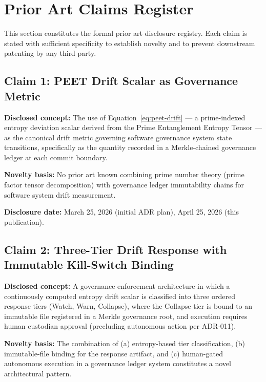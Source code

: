 \documentclass[11pt,letterpaper]{article}
\theoremstyle{definition}
\theoremstyle{remark}
\begin{document}
\section{Prior Art Claims Register}

This section constitutes the formal prior art disclosure registry.
Each claim is stated with sufficient specificity to establish
novelty and to prevent downstream patenting by any third party.

\subsection{Claim 1: PEET Drift Scalar as Governance Metric}

\textbf{Disclosed concept:} The use of Equation~\eqref{eq:peet-drift}
--- a prime-indexed entropy deviation scalar derived from the Prime
Entanglement Entropy Tensor --- as the canonical drift metric
governing software governance system state transitions, specifically
as the quantity recorded in a Merkle-chained governance ledger at
each commit boundary.

\textbf{Novelty basis:} No prior art known combining prime number
theory (prime factor tensor decomposition) with governance ledger
immutability chains for software system drift measurement.

\textbf{Disclosure date:} March 25, 2026 (initial ADR plan),
April 25, 2026 (this publication).

\subsection{Claim 2: Three-Tier Drift Response with Immutable Kill-Switch Binding}

\textbf{Disclosed concept:} A governance enforcement architecture
in which a continuously computed entropy drift scalar is classified
into three ordered response tiers (Watch, Warn, Collapse), where
the Collapse tier is bound to an immutable file registered in a
Merkle governance root, and execution requires human custodian
approval (precluding autonomous action per ADR-011).

\textbf{Novelty basis:} The combination of (a) entropy-based tier
classification, (b) immutable-file binding for the response artifact,
and (c) human-gated autonomous execution in a governance ledger
system constitutes a novel architectural pattern.
\end{document}
